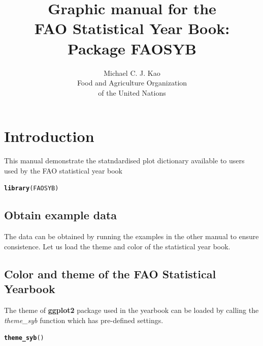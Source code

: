 \documentclass{article}\usepackage{graphicx, color}
\makeatletter
\newcommand{\hlfunctioncall}[1]{\textcolor[rgb]{0.501960784313725,0,0.329411764705882}{\textbf{#1}}}%
\newenvironment{kframe}{%
 \def\at@end@of@kframe{}%
 \ifinner\ifhmode%
  \def\at@end@of@kframe{\end{minipage}}%
  \begin{minipage}{\columnwidth}%
 \fi\fi%
 \def\FrameCommand##1{\hskip\@totalleftmargin \hskip-\fboxsep
 \colorbox{shadecolor}{##1}\hskip-\fboxsep
     \hskip-\linewidth \hskip-\@totalleftmargin \hskip\columnwidth}%
 \MakeFramed {\advance\hsize-\width
   \@totalleftmargin\z@ \linewidth\hsize
   \@setminipage}}%
 {\par\unskip\endMakeFramed%
 \at@end@of@kframe}
\newenvironment{knitrout}{}{} %
\makeatother
\begin{document}
\title{\bf Graphic manual for the \\FAO Statistical Year Book: Package
  FAOSYB}

\author{Michael C. J. Kao\\ Food and Agriculture Organization \\ of
  the United Nations}

\date{}

\maketitle
\tableofcontents





\section{Introduction}
This manual demonstrate the statndardised plot dictionary available to
users used by the FAO statistical year book


\begin{knitrout}
\color{fgcolor}\begin{kframe}
\begin{alltt}
\hlfunctioncall{library}(FAOSYB)
\end{alltt}
\end{kframe}
\end{knitrout}


\subsection{Obtain example data}
The data can be obtained by running the examples in the other manual
to ensure consistence. Let us load the theme and color of the
statistical year book.


\subsection{Color and theme of the FAO Statistical Yearbook}
The theme of \textbf{ggplot2} package used in the yearbook can be
loaded by calling the \textit{theme\_syb} function which has
pre-defined settings.

\begin{knitrout}
\color{fgcolor}\begin{kframe}
\begin{alltt}
\hlfunctioncall{theme_syb}()
\end{alltt}
\end{kframe}
\end{knitrout}
\end{document}
